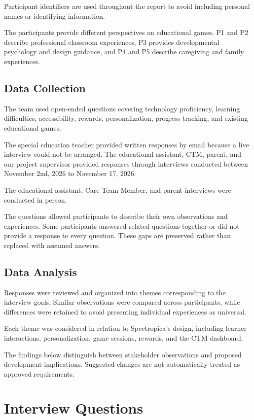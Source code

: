 \documentclass[12pt, titlepage]{article}
\begin{document}
Participant identifiers are used throughout the report to avoid including personal names or identifying information.

The participants provide different perspectives on educational games. P1 and P2 describe professional classroom experiences, P3 provides developmental psychology and design guidance, and P4 and P5 describe caregiving and family experiences.

\subsection{Data Collection}

The team used open-ended questions covering technology proficiency, learning difficulties, accessibility, rewards, personalization, progress tracking, and existing educational games.

The special education teacher provided written responses by email because a live interview could not be arranged. The educational assistant, CTM, parent, and our project supervisor provided responses through interviews conducted between November 2nd, 2026 to November 17, 2026.

The educational assistant, Care Team Member, and parent interviews were
conducted in person.

The questions allowed participants to describe their own observations and experiences. Some participants answered related questions together or did not provide a response to every question. These gaps are preserved rather than replaced with assumed answers.

\subsection{Data Analysis}

Responses were reviewed and organized into themes corresponding to the interview goals. Similar observations were compared across participants, while differences were retained to avoid presenting individual experiences as universal.

Each theme was considered in relation to Spectropica's design, including learner interactions, personalization, game sessions, rewards, and the CTM dashboard.

The findings below distinguish between stakeholder observations and proposed development implications. Suggested changes are not automatically treated as approved requirements.

\section{Interview Questions}
\label{sec:interview-questions}
\end{document}
